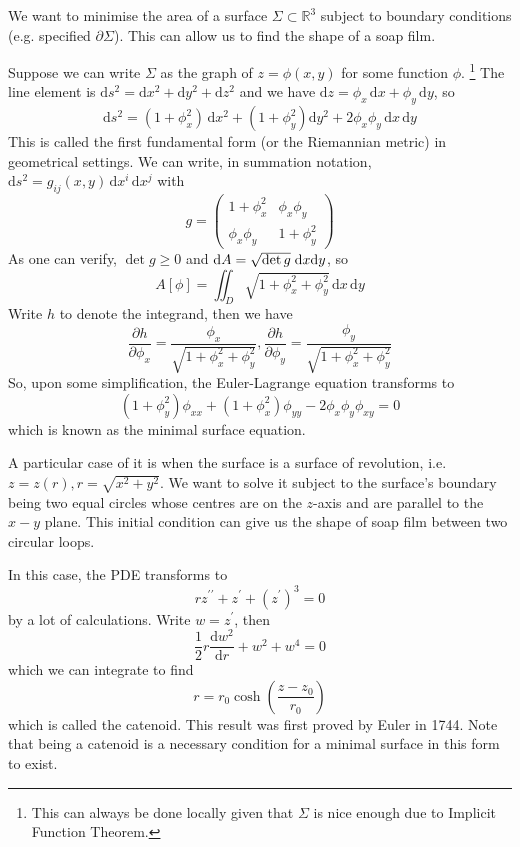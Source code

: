 \documentclass[a4paper]{article}
\begin{document}
\begin{example}
    We want to minimise the area of a surface $\Sigma\subset\mathbb R^3$ subject to boundary conditions (e.g. specified $\partial\Sigma$).
    This can allow us to find the shape of a soap film.

    Suppose we can write $\Sigma$ as the graph of $z=\phi(x,y)$ for some function $\phi$.
    \footnote{This can always be done locally given that $\Sigma$ is nice enough due to Implicit Function Theorem.}
    The line element is $\mathrm ds^2=\mathrm dx^2+\mathrm dy^2+\mathrm dz^2$ and we have $\mathrm dz=\phi_x\,\mathrm dx+\phi_y\,\mathrm dy$, so
    $$\mathrm ds^2=(1+\phi_x^2)\,\mathrm dx^2+(1+\phi_y^2)\mathrm dy^2+2\phi_x\phi_y\,\mathrm dx\,\mathrm dy$$
    This is called the first fundamental form (or the Riemannian metric) in geometrical settings.
    We can write, in summation notation, $\mathrm ds^2=g_{ij}(x,y)\,\mathrm dx^i\,\mathrm dx^j$ with
    $$g=\begin{pmatrix}
            1+\phi_x^2&\phi_x\phi_y\\
            \phi_x\phi_y&1+\phi_y^2
    \end{pmatrix}$$
    As one can verify, $\det g\ge 0$ and $ \mathrm{d} A = \sqrt{\det g}\;\mathrm{d} x\mathrm{d} y $, so
    $$A[\phi]=\iint_D\sqrt{1+\phi_x^2+\phi_y^2}\,\mathrm dx\,\mathrm dy$$
    Write $h$ to denote the integrand, then we have
    $$\frac{\partial h}{\partial\phi_x}=\frac{\phi_x}{\sqrt{1+\phi_x^2+\phi_y^2}},\frac{\partial h}{\partial\phi_y}=\frac{\phi_y}{\sqrt{1+\phi_x^2+\phi_y^2}}$$
    So, upon some simplification, the Euler-Lagrange equation transforms to
    $$(1+\phi_y^2)\phi_{xx}+(1+\phi_x^2)\phi_{yy}-2\phi_x\phi_y\phi_{xy}=0$$
    which is known as the minimal surface equation.

    A particular case of it is when the surface is a surface of revolution, i.e. $z=z(r),r=\sqrt{x^2+y^2}$.
    We want to solve it subject to the surface's boundary being two equal circles whose centres are on the $z$-axis and are parallel to the $x-y$ plane.
    This initial condition can give us the shape of soap film between two circular loops.

    In this case, the PDE transforms to
    $$rz^{\prime\prime}+z^\prime+(z^\prime)^3=0$$
    by a lot of calculations.
    Write $w=z^\prime$, then
    $$\frac{1}{2}r\frac{\mathrm dw^2}{\mathrm dr}+w^2+w^4=0$$
    which we can integrate to find
    $$r=r_0\cosh\left( \frac{z-z_0}{r_0} \right)$$
    which is called the catenoid.
    This result was first proved by Euler in 1744.
    Note that being a catenoid is a necessary condition for a minimal surface in this form to exist.


\end{example}
\end{document}
